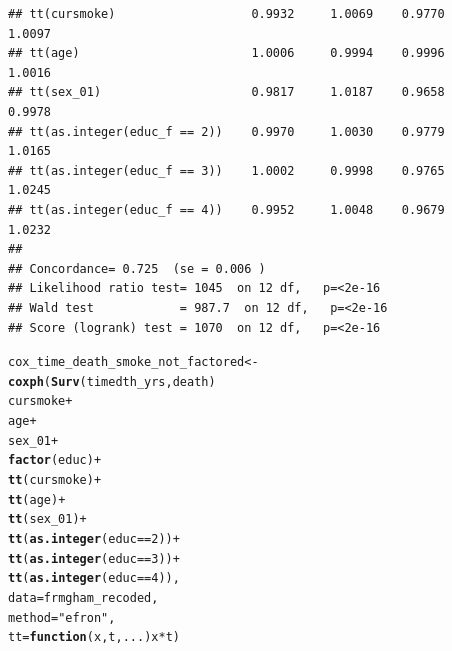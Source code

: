 \documentclass{article}\usepackage[]{graphicx}\usepackage[]{color}
\makeatletter
\newcommand{\hlnum}[1]{\textcolor[rgb]{0.686,0.059,0.569}{#1}}%
\newcommand{\hlstr}[1]{\textcolor[rgb]{0.192,0.494,0.8}{#1}}%
\newcommand{\hlopt}[1]{\textcolor[rgb]{0,0,0}{#1}}%
\newcommand{\hlstd}[1]{\textcolor[rgb]{0.345,0.345,0.345}{#1}}%
\newcommand{\hlkwa}[1]{\textcolor[rgb]{0.161,0.373,0.58}{\textbf{#1}}}%
\newcommand{\hlkwb}[1]{\textcolor[rgb]{0.69,0.353,0.396}{#1}}%
\newcommand{\hlkwc}[1]{\textcolor[rgb]{0.333,0.667,0.333}{#1}}%
\newcommand{\hlkwd}[1]{\textcolor[rgb]{0.737,0.353,0.396}{\textbf{#1}}}%
\newenvironment{kframe}{%
 \def\at@end@of@kframe{}%
 \ifinner\ifhmode%
  \def\at@end@of@kframe{\end{minipage}}%
  \begin{minipage}{\columnwidth}%
 \fi\fi%
 \def\FrameCommand##1{\hskip\@totalleftmargin \hskip-\fboxsep
 \colorbox{shadecolor}{##1}\hskip-\fboxsep
     \hskip-\linewidth \hskip-\@totalleftmargin \hskip\columnwidth}%
 \MakeFramed {\advance\hsize-\width
   \@totalleftmargin\z@ \linewidth\hsize
   \@setminipage}}%
 {\par\unskip\endMakeFramed%
 \at@end@of@kframe}
\newenvironment{knitrout}{}{} %
\makeatother
\begin{document}
\begin{knitrout}
\begin{kframe}
\begin{verbatim}
## tt(cursmoke)                   0.9932     1.0069    0.9770    1.0097
## tt(age)                        1.0006     0.9994    0.9996    1.0016
## tt(sex_01)                     0.9817     1.0187    0.9658    0.9978
## tt(as.integer(educ_f == 2))    0.9970     1.0030    0.9779    1.0165
## tt(as.integer(educ_f == 3))    1.0002     0.9998    0.9765    1.0245
## tt(as.integer(educ_f == 4))    0.9952     1.0048    0.9679    1.0232
## 
## Concordance= 0.725  (se = 0.006 )
## Likelihood ratio test= 1045  on 12 df,   p=<2e-16
## Wald test            = 987.7  on 12 df,   p=<2e-16
## Score (logrank) test = 1070  on 12 df,   p=<2e-16
\end{verbatim}
\end{kframe}
\end{knitrout}


\begin{knitrout}
\color{fgcolor}\begin{kframe}
\begin{alltt}
\hlstd{cox_time_death_smoke_not_factored} \hlkwb{<-}
  \hlkwd{coxph}\hlstd{(}\hlkwd{Surv}\hlstd{(timedth_yrs, death)} \hlopt{~}
          \hlstd{cursmoke} \hlopt{+}
          \hlstd{age} \hlopt{+}
          \hlstd{sex_01} \hlopt{+}
          \hlkwd{factor}\hlstd{(educ)} \hlopt{+}
          \hlkwd{tt}\hlstd{(cursmoke)} \hlopt{+}
          \hlkwd{tt}\hlstd{(age)} \hlopt{+}
          \hlkwd{tt}\hlstd{(sex_01)} \hlopt{+}
          \hlkwd{tt}\hlstd{(}\hlkwd{as.integer}\hlstd{(educ} \hlopt{==} \hlnum{2}\hlstd{))} \hlopt{+}
          \hlkwd{tt}\hlstd{(}\hlkwd{as.integer}\hlstd{(educ} \hlopt{==} \hlnum{3}\hlstd{))} \hlopt{+}
          \hlkwd{tt}\hlstd{(}\hlkwd{as.integer}\hlstd{(educ} \hlopt{==} \hlnum{4}\hlstd{)),}
        \hlkwc{data} \hlstd{= frmgham_recoded,}
        \hlkwc{method} \hlstd{=} \hlstr{"efron"}\hlstd{,}
        \hlkwc{tt} \hlstd{=} \hlkwa{function}\hlstd{(}\hlkwc{x}\hlstd{,}\hlkwc{t}\hlstd{,}\hlkwc{...}\hlstd{) x}\hlopt{*}\hlstd{t)}


\end{alltt}
\end{kframe}
\end{knitrout}
\end{document}
